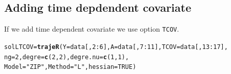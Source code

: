 \documentclass{article}\usepackage[]{graphicx}\usepackage[]{color}
\makeatletter
\newcommand{\hlnum}[1]{\textcolor[rgb]{0.686,0.059,0.569}{#1}}%
\newcommand{\hlstr}[1]{\textcolor[rgb]{0.192,0.494,0.8}{#1}}%
\newcommand{\hlopt}[1]{\textcolor[rgb]{0,0,0}{#1}}%
\newcommand{\hlstd}[1]{\textcolor[rgb]{0.345,0.345,0.345}{#1}}%
\newcommand{\hlkwb}[1]{\textcolor[rgb]{0.69,0.353,0.396}{#1}}%
\newcommand{\hlkwc}[1]{\textcolor[rgb]{0.333,0.667,0.333}{#1}}%
\newcommand{\hlkwd}[1]{\textcolor[rgb]{0.737,0.353,0.396}{\textbf{#1}}}%
\newenvironment{kframe}{%
 \def\at@end@of@kframe{}%
 \ifinner\ifhmode%
  \def\at@end@of@kframe{\end{minipage}}%
  \begin{minipage}{\columnwidth}%
 \fi\fi%
 \def\FrameCommand##1{\hskip\@totalleftmargin \hskip-\fboxsep
 \colorbox{shadecolor}{##1}\hskip-\fboxsep
     \hskip-\linewidth \hskip-\@totalleftmargin \hskip\columnwidth}%
 \MakeFramed {\advance\hsize-\width
   \@totalleftmargin\z@ \linewidth\hsize
   \@setminipage}}%
 {\par\unskip\endMakeFramed%
 \at@end@of@kframe}
\newenvironment{knitrout}{}{} %
\makeatother
\begin{document}
\subsection{Adding time depdendent covariate}
If we add time dependent covariate we use option \verb|TCOV|.
\begin{knitrout}
\color{fgcolor}\begin{kframe}
\begin{alltt}
\hlstd{solLTCOV} \hlkwb{=} \hlkwd{trajeR}\hlstd{(}\hlkwc{Y} \hlstd{= data[,}\hlnum{2}\hlopt{:}\hlnum{6}\hlstd{],} \hlkwc{A} \hlstd{= data[,}\hlnum{7}\hlopt{:}\hlnum{11}\hlstd{],} \hlkwc{TCOV} \hlstd{= data[,}\hlnum{13}\hlopt{:}\hlnum{17}\hlstd{],}
                  \hlkwc{ng} \hlstd{=} \hlnum{2}\hlstd{,} \hlkwc{degre}\hlstd{=}\hlkwd{c}\hlstd{(}\hlnum{2}\hlstd{,}\hlnum{2}\hlstd{),} \hlkwc{degre.nu} \hlstd{=} \hlkwd{c}\hlstd{(}\hlnum{1}\hlstd{,}\hlnum{1}\hlstd{),}
                  \hlkwc{Model}\hlstd{=}\hlstr{"ZIP"}\hlstd{,} \hlkwc{Method} \hlstd{=} \hlstr{"L"}\hlstd{,} \hlkwc{hessian} \hlstd{=} \hlnum{TRUE}\hlstd{)}
\end{alltt}
\end{kframe}
\end{knitrout}
\end{document}
